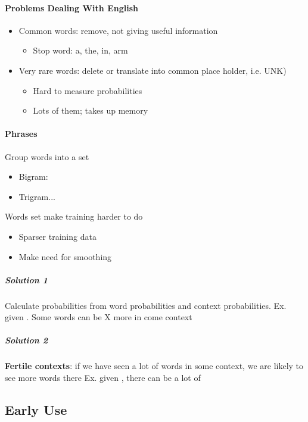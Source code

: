       \paragraph{Problems Dealing With English}
      \begin{itemize}
        \item Common words: remove, not giving useful information
        \begin{itemize}
          \item Stop word: a, the, in, arm
        \end{itemize}

        \item Very rare words: delete or translate into common place holder, i.e. UNK)
        \begin{itemize}
          \item Hard to measure probabilities
          \item Lots of them; takes up memory
        \end{itemize}
      \end{itemize}

      \paragraph{Phrases}
      Group words into a set
      \begin{itemize}
        \item Bigram: 
        \item Trigram...
      \end{itemize}

      Words set make training harder to do
      \begin{itemize}
        \item Sparser training data
        \item Make need for smoothing
      \end{itemize}

      \subparagraph{Solution 1}
      Calculate probabilities from word probabilities and context probabilities.
      Ex. given . Some words can be X more in come context

      \subparagraph{Solution 2}
      \textbf{Fertile contexts}: if we have seen a lot of words in some context,
      we are likely to see more words there
      Ex. given , there can be a lot of 

  \subsection{Early Use}

